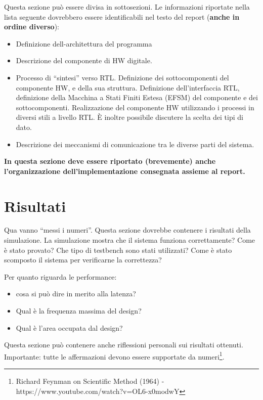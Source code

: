 \documentclass[]{IEEEtran}
\begin{document}
Questa sezione pu\`o essere divisa in sottosezioni. Le informazioni riportate nella lista seguente dovrebbero essere identificabili nel testo del report (\textbf{anche in ordine diverso}):
\begin{itemize}
\item Definizione dell-architettura del programma
\item Descrizione del componente di HW digitale.
\item Processo di ``sintesi'' verso RTL. Definizione dei sottocomponenti del componente HW, e della sua struttura. Definizione dell'interfaccia RTL, definizione della Macchina a Stati Finiti Estesa (EFSM) del componente e dei sottocomponenti. Realizzazione del componente HW utilizzando i processi in diversi stili a livello RTL. \`E inoltre possibile discutere la scelta dei tipi di dato.
\item Descrizione dei meccanismi di comunicazione tra le diverse parti del sistema.
\end{itemize}

\textbf{In questa sezione deve essere riportato (brevemente) anche l'organizzazione dell'implementazione consegnata assieme al report.}

\section{Risultati}

Qua vanno ``messi i numeri''. Questa sezione dovrebbe contenere i risultati della simulazione. La simulazione mostra che il sistema funziona correttamente? Come \`e stato provato? Che tipo di testbench sono stati utilizzati? Come \`e stato scomposto il sistema per verificarne la correttezza?

Per quanto riguarda le performance:
\begin{itemize}
\item cosa si pu\`o dire in merito alla latenza?
\item Qual è la frequenza massima del design? 
\item Qual è l'area occupata dal design? 
\end{itemize}

Questa sezione pu\`o contenere anche riflessioni personali sui risultati ottenuti. Importante: tutte le affermazioni devono essere supportate da numeri\footnote{Richard Feynman on Scientific Method (1964) -\\ https://www.youtube.com/watch?v=OL6-x0modwY}.
\end{document}
